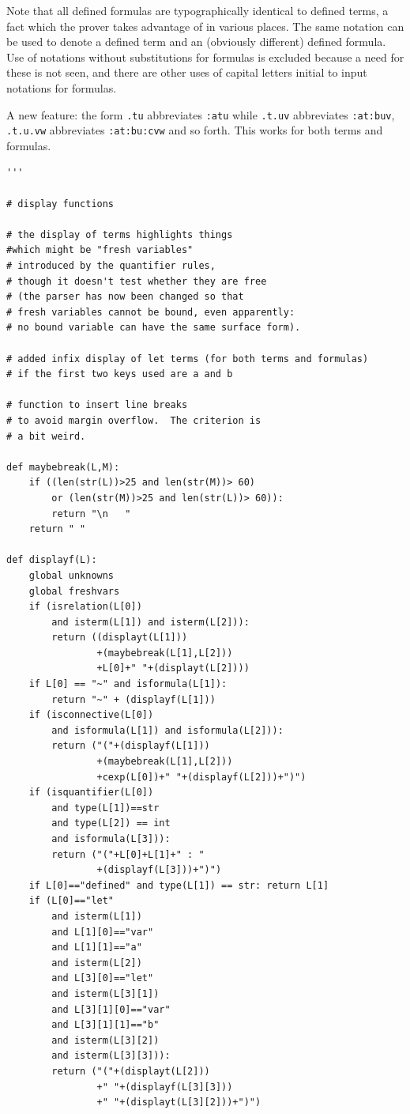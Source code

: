 \documentclass{article}
\begin{document}
\begin{itemize}
Note that all defined formulas are typographically identical to defined terms,  a fact which the prover takes advantage of in various places.  The same notation can be used to denote a defined term and an (obviously different) defined formula.   Use of notations without substitutions for formulas is excluded because a need for these is not seen, and there are other uses of capital letters initial to input notations for formulas.


\end{itemize}

A new feature:  the form {\tt .tu} abbreviates {\tt :atu} while {\tt.t.uv} abbreviates {\tt :at:buv}, {\tt.t.u.vw} abbreviates
{\tt :at:bu:cvw} and so forth.  This works for both terms and formulas.

\begin{verbatim}
'''

# display functions

# the display of terms highlights things
#which might be "fresh variables"
# introduced by the quantifier rules,
# though it doesn't test whether they are free
# (the parser has now been changed so that
# fresh variables cannot be bound, even apparently:
# no bound variable can have the same surface form).

# added infix display of let terms (for both terms and formulas)
# if the first two keys used are a and b

# function to insert line breaks
# to avoid margin overflow.  The criterion is
# a bit weird.

def maybebreak(L,M):
    if ((len(str(L))>25 and len(str(M))> 60)
        or (len(str(M))>25 and len(str(L))> 60)):
        return "\n   "
    return " "

def displayf(L):
    global unknowns
    global freshvars
    if (isrelation(L[0])
        and isterm(L[1]) and isterm(L[2])):
        return ((displayt(L[1]))
                +(maybebreak(L[1],L[2]))
                +L[0]+" "+(displayt(L[2])))
    if L[0] == "~" and isformula(L[1]):
        return "~" + (displayf(L[1]))
    if (isconnective(L[0])
        and isformula(L[1]) and isformula(L[2])):
        return ("("+(displayf(L[1]))
                +(maybebreak(L[1],L[2]))
                +cexp(L[0])+" "+(displayf(L[2]))+")")
    if (isquantifier(L[0])
        and type(L[1])==str
        and type(L[2]) == int
        and isformula(L[3])):
        return ("("+L[0]+L[1]+" : "
                +(displayf(L[3]))+")")
    if L[0]=="defined" and type(L[1]) == str: return L[1]
    if (L[0]=="let"
        and isterm(L[1])
        and L[1][0]=="var"
        and L[1][1]=="a"
        and isterm(L[2])
        and L[3][0]=="let"
        and isterm(L[3][1])
        and L[3][1][0]=="var"
        and L[3][1][1]=="b"
        and isterm(L[3][2])
        and isterm(L[3][3])):
        return ("("+(displayt(L[2]))
                +" "+(displayf(L[3][3]))
                +" "+(displayt(L[3][2]))+")")


\end{verbatim}
\end{document}
